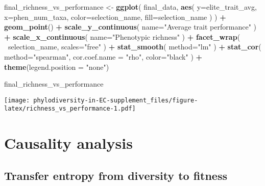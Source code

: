 \documentclass[]{book}
\newenvironment{Shaded}{\begin{snugshade}}{\end{snugshade}}
\newcommand{\DataTypeTok}[1]{\textcolor[rgb]{0.13,0.29,0.53}{#1}}
\newcommand{\KeywordTok}[1]{\textcolor[rgb]{0.13,0.29,0.53}{\textbf{#1}}}
\newcommand{\NormalTok}[1]{#1}
\newcommand{\OperatorTok}[1]{\textcolor[rgb]{0.81,0.36,0.00}{\textbf{#1}}}
\newcommand{\StringTok}[1]{\textcolor[rgb]{0.31,0.60,0.02}{#1}}
\begin{document}
\begin{Shaded}
\begin{Highlighting}[]
\NormalTok{final_richness_vs_performance <-}\StringTok{ }\KeywordTok{ggplot}\NormalTok{(}
\NormalTok{    final_data,}
    \KeywordTok{aes}\NormalTok{(}
        \DataTypeTok{y=}\NormalTok{elite_trait_avg,}
        \DataTypeTok{x=}\NormalTok{phen_num_taxa,}
        \DataTypeTok{color=}\NormalTok{selection_name,}
        \DataTypeTok{fill=}\NormalTok{selection_name}
\NormalTok{    )}
\NormalTok{  ) }\OperatorTok{+}
\StringTok{  }\KeywordTok{geom_point}\NormalTok{() }\OperatorTok{+}
\StringTok{    }\KeywordTok{scale_y_continuous}\NormalTok{(}
        \DataTypeTok{name=}\StringTok{"Average trait performance"}
\NormalTok{  ) }\OperatorTok{+}
\StringTok{  }\KeywordTok{scale_x_continuous}\NormalTok{(}
        \DataTypeTok{name=}\StringTok{"Phenotypic richness"}
\NormalTok{  ) }\OperatorTok{+}\StringTok{ }
\StringTok{  }\KeywordTok{facet_wrap}\NormalTok{(}
      \OperatorTok{~}\NormalTok{selection_name, }\DataTypeTok{scales=}\StringTok{"free"}
\NormalTok{  ) }\OperatorTok{+}\StringTok{ }
\StringTok{  }\KeywordTok{stat_smooth}\NormalTok{(}
    \DataTypeTok{method=}\StringTok{"lm"}
\NormalTok{  ) }\OperatorTok{+}\StringTok{ }
\StringTok{  }\KeywordTok{stat_cor}\NormalTok{(}
    \DataTypeTok{method=}\StringTok{"spearman"}\NormalTok{, }\DataTypeTok{cor.coef.name =} \StringTok{"rho"}\NormalTok{, }\DataTypeTok{color=}\StringTok{"black"}
\NormalTok{  ) }\OperatorTok{+}
\StringTok{  }\KeywordTok{theme}\NormalTok{(}\DataTypeTok{legend.position =} \StringTok{"none"}\NormalTok{)}
  
\NormalTok{final_richness_vs_performance}
\end{Highlighting}
\end{Shaded}

\texttt{[image: phylodiversity-in-EC-supplement\_files/figure-latex/richness\_vs\_performance-1.pdf]}

\hypertarget{causality-analysis}{%
\section{Causality analysis}\label{causality-analysis}}

\hypertarget{transfer-entropy-from-diversity-to-fitness}{%
\subsection{Transfer entropy from diversity to fitness}\label{transfer-entropy-from-diversity-to-fitness}}
\end{document}
